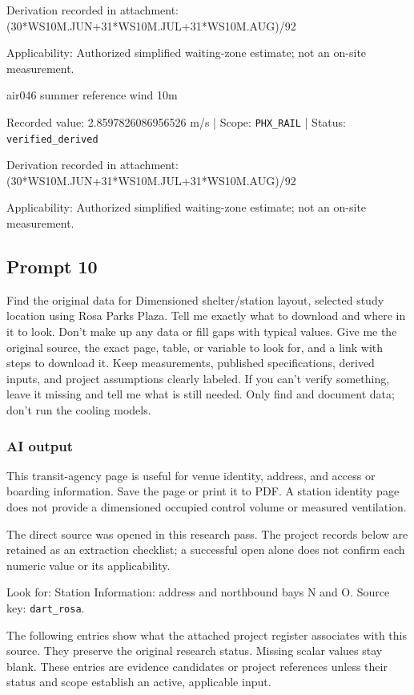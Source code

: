 Derivation recorded in attachment: (30*WS10M.JUN+31*WS10M.JUL+31*WS10M.AUG)/92

Applicability: Authorized simplified waiting-zone estimate; not an on-site measurement.

air046  summer reference wind 10m

Recorded value: 2.8597826086956526 m/s | Scope: \nolinkurl{PHX_RAIL} | Status: \nolinkurl{verified_derived}

Derivation recorded in attachment: (30*WS10M.JUN+31*WS10M.JUL+31*WS10M.AUG)/92

Applicability: Authorized simplified waiting-zone estimate; not an on-site measurement.

\subsection*{Prompt 10}
Find the original data for Dimensioned shelter/station layout, selected study location using Rosa Parks Plaza. Tell me exactly what to download and where in it to look. Don’t make up any data or fill gaps with typical values. Give me the original source, the exact page, table, or variable to look for, and a link with steps to download it. Keep measurements, published specifications, derived inputs, and project assumptions clearly labeled. If you can’t verify something, leave it missing and tell me what is still needed. Only find and document data; don’t run the cooling models.

\subsubsection*{AI output}
This transit-agency page is useful for venue identity, address, and access or boarding information. Save the page or print it to PDF. A station identity page does not provide a dimensioned occupied control volume or measured ventilation.

The direct source was opened in this research pass. The project records below are retained as an extraction checklist; a successful open alone does not confirm each numeric value or its applicability.

Look for: Station Information: address and northbound bays N and O. Source key: \nolinkurl{dart_rosa}.

The following entries show what the attached project register associates with this source. They preserve the original research status. Missing scalar values stay blank. These entries are evidence candidates or project references unless their status and scope establish an active, applicable input.

